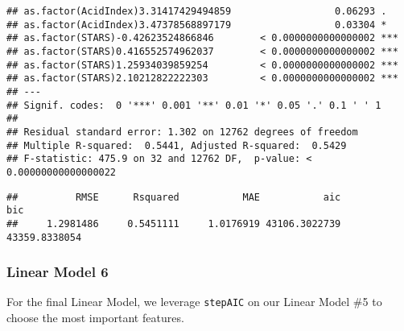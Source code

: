 \documentclass[
]{article}
\begin{document}
\begin{verbatim}
## as.factor(AcidIndex)3.31417429494859                  0.06293 .  
## as.factor(AcidIndex)3.47378568897179                  0.03304 *  
## as.factor(STARS)-0.42623524866846        < 0.0000000000000002 ***
## as.factor(STARS)0.416552574962037        < 0.0000000000000002 ***
## as.factor(STARS)1.25934039859254         < 0.0000000000000002 ***
## as.factor(STARS)2.10212822222303         < 0.0000000000000002 ***
## ---
## Signif. codes:  0 '***' 0.001 '**' 0.01 '*' 0.05 '.' 0.1 ' ' 1
## 
## Residual standard error: 1.302 on 12762 degrees of freedom
## Multiple R-squared:  0.5441, Adjusted R-squared:  0.5429 
## F-statistic: 475.9 on 32 and 12762 DF,  p-value: < 0.00000000000000022
\end{verbatim}

\begin{verbatim}
##          RMSE      Rsquared           MAE           aic           bic 
##     1.2981486     0.5451111     1.0176919 43106.3022739 43359.8338054
\end{verbatim}

\hypertarget{linear-model-6}{%
\subsubsection{Linear Model 6}\label{linear-model-6}}

For the final Linear Model, we leverage \texttt{stepAIC} on our Linear
Model \#5 to choose the most important features.
\end{document}
